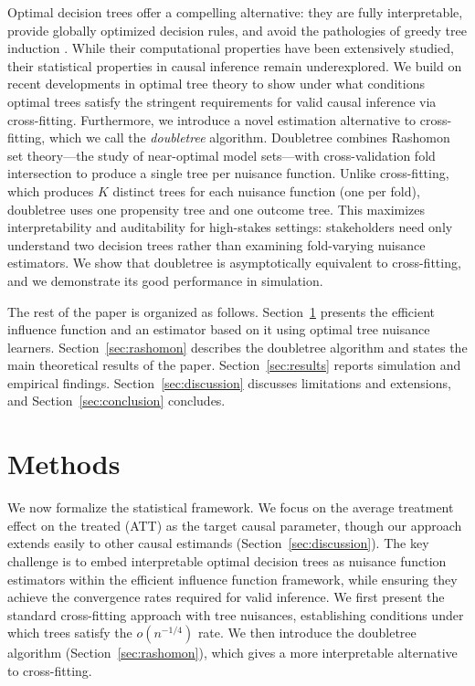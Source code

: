 \documentclass[12pt]{article}
\begin{document}
Optimal decision trees offer a compelling alternative: they are fully interpretable, provide globally optimized decision rules, and avoid the pathologies of greedy tree induction \citep{lin2020}. While their computational properties have been extensively studied, their statistical properties in causal inference remain underexplored. We build on recent developments in optimal tree theory to show under what conditions optimal trees satisfy the stringent requirements for valid causal inference via cross-fitting. Furthermore, we introduce a novel estimation alternative to cross-fitting, which we call the \textit{doubletree} algorithm. Doubletree combines Rashomon set theory---the study of near-optimal model sets---with cross-validation fold intersection to produce a single tree per nuisance function. Unlike cross-fitting, which produces $K$ distinct trees for each nuisance function (one per fold), doubletree uses one propensity tree and one outcome tree. This maximizes interpretability and auditability for high-stakes settings: stakeholders need only understand two decision trees rather than examining fold-varying nuisance estimators. We show that doubletree is asymptotically equivalent to cross-fitting, and we demonstrate its good performance in simulation.

The rest of the paper is organized as follows. Section~\ref{sec:methods} presents the efficient influence function and an estimator based on it using optimal tree nuisance learners. Section~\ref{sec:rashomon} describes the doubletree algorithm and states the main theoretical results of the paper. Section~\ref{sec:results} reports simulation and empirical findings. Section~\ref{sec:discussion} discusses limitations and extensions, and Section~\ref{sec:conclusion} concludes.

\section{Methods}
\label{sec:methods}

We now formalize the statistical framework. We focus on the average treatment effect on the treated (ATT) as the target causal parameter, though our approach extends easily to other causal estimands (Section~\ref{sec:discussion}). The key challenge is to embed interpretable optimal decision trees as nuisance function estimators within the efficient influence function framework, while ensuring they achieve the convergence rates required for valid inference. We first present the standard cross-fitting approach with tree nuisances, establishing conditions under which trees satisfy the $o(n^{-1/4})$ rate. We then introduce the doubletree algorithm (Section~\ref{sec:rashomon}), which gives a more interpretable alternative to cross-fitting.
\end{document}
